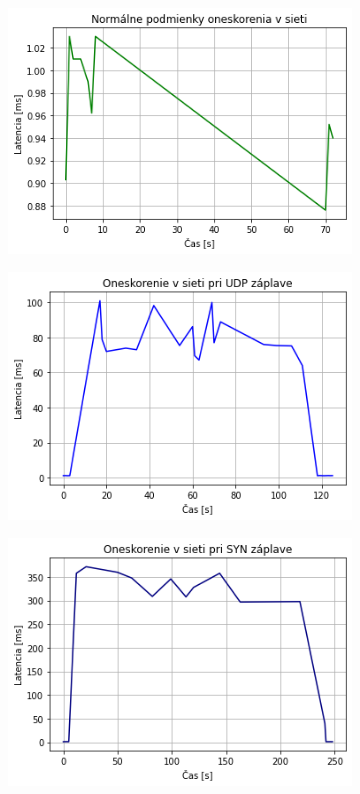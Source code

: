 \documentclass[12pt, a4paper]{article}
\begin{document}
\begin{figure}[h!]
	\centering
	\begin{subfigure}[t]{.32\textwidth}
  		\centering
  		\includegraphics[width=\textwidth]{images/normal-latency.png}
	\end{subfigure}
	\begin{subfigure}[t]{.32\textwidth}
  		\centering
  		\includegraphics[width=\textwidth]{images/UDP-flood-graph.png}
	\end{subfigure}
	\begin{subfigure}[t]{.32\textwidth}
  		\centering
  		\includegraphics[width=\textwidth]{images/SYN-flood-graph.png}

\end{subfigure}
\end{figure}
\end{document}
